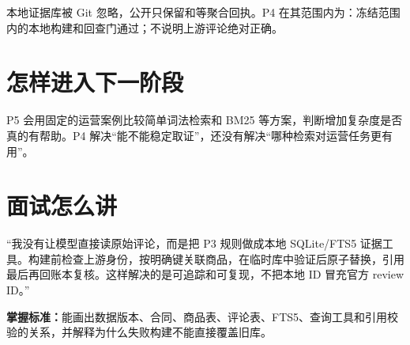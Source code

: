 本地证据库被 Git 忽略，公开只保留和等聚合回执。P4 在其范围内为\statuspassed：冻结范围内的本地构建和回查门通过；不说明上游评论绝对正确。

\section{怎样进入下一阶段}

P5 会用固定的运营案例比较简单词法检索和 BM25 等方案，判断增加复杂度是否真的有帮助。P4 解决“能不能稳定取证”，还没有解决“哪种检索对运营任务更有用”。

\section{面试怎么讲}

\begin{interviewbox}
“我没有让模型直接读原始评论，而是把 P3 规则做成本地 SQLite/FTS5 证据工具。构建前检查上游身份，按明确键关联商品，在临时库中验证后原子替换，引用最后再回账本复核。这样解决的是可追踪和可复现，不把本地 ID 冒充官方 review ID。”
\end{interviewbox}

\textbf{掌握标准：}能画出数据版本、合同、商品表、评论表、FTS5、查询工具和引用校验的关系，并解释为什么失败构建不能直接覆盖旧库。
